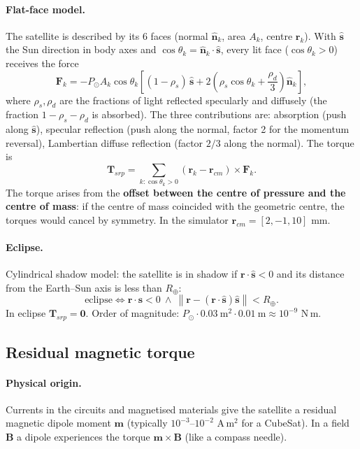 \documentclass[11pt,a4paper]{article}
\newcommand{\vect}[1]{\bm{#1}}
\newcommand{\T}{\vect{T}}
\newcommand{\norm}[1]{\left\lVert #1 \right\rVert}
\begin{document}
\paragraph{Flat-face model.} The satellite is described by its 6 faces
(normal $\hat{\vect n}_k$, area $A_k$, centre $\vect r_k$). With
$\hat{\vect s}$ the Sun direction in body axes and
$\cos\theta_k = \hat{\vect n}_k\cdot\hat{\vect s}$, every lit face
($\cos\theta_k>0$) receives the force
\begin{equation}
  \vect F_k = -P_\odot A_k\cos\theta_k
  \left[(1-\rho_s)\,\hat{\vect s} + 2\left(\rho_s\cos\theta_k + \frac{\rho_d}{3}\right)\hat{\vect n}_k\right],
\end{equation}
where $\rho_s,\rho_d$ are the fractions of light reflected specularly and
diffusely (the fraction $1-\rho_s-\rho_d$ is absorbed). The three contributions
are: absorption (push along $\hat{\vect s}$), specular reflection
(push along the normal, factor 2 for the momentum reversal),
Lambertian diffuse reflection (factor $2/3$ along the normal). The torque is
\begin{equation}
  \T_{srp} = \sum_{k:\cos\theta_k>0} (\vect r_k - \vect r_{cm})\times\vect F_k .
\end{equation}
The torque arises from the \textbf{offset between the centre of pressure and the centre of mass}:
if the centre of mass coincided with the geometric centre, the torques would
cancel by symmetry. In the simulator $\vect r_{cm} = [2,-1,10]$ mm.

\paragraph{Eclipse.} Cylindrical shadow model: the satellite is in shadow if
$\vect r\cdot\hat{\vect s}<0$ and its distance from the Earth--Sun axis is less
than $R_\oplus$:
\begin{equation}
  \text{eclipse}\iff \vect r\cdot\hat{\vect s} < 0\ \wedge\
  \norm{\vect r - (\vect r\cdot\hat{\vect s})\hat{\vect s}} < R_\oplus .
\end{equation}
In eclipse $\T_{srp}=\vect 0$. Order of magnitude:
$P_\odot\cdot0.03\ \text{m}^2\cdot0.01\ \text{m}\approx 10^{-9}$ N\,m.

\subsection{Residual magnetic torque}
\paragraph{Physical origin.} Currents in the circuits and magnetised materials
give the satellite a residual magnetic dipole moment $\vect m$
(typically $10^{-3}$--$10^{-2}$ A\,m$^2$ for a CubeSat). In a field
$\vect B$ a dipole experiences the torque $\vect m\times\vect B$ (like a
compass needle).
\end{document}
